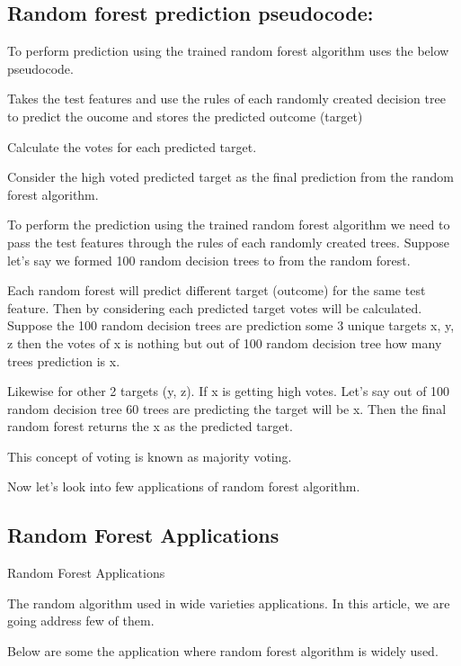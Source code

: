 


\subsection*{Random forest prediction pseudocode:}
To perform prediction using the trained random forest algorithm uses the below pseudocode.

Takes the test features and use the rules of each randomly created decision tree to predict the oucome and stores the predicted outcome (target)

Calculate the votes for each predicted target.

Consider the high voted predicted target as the final prediction from the random forest algorithm.

To perform the prediction using the trained random forest algorithm we need to pass the test features through the rules of each randomly created trees. Suppose let’s say we formed 100 random decision trees to from the random forest.

Each random forest will predict different target (outcome) for the same test feature. Then by considering each predicted target votes will be calculated. Suppose the 100 random decision trees are prediction some 3 unique targets x, y, z then the votes of x is nothing but out of 100 random decision tree how many trees prediction is x.

Likewise for other 2 targets (y, z). If x is getting high votes. Let’s say out of 100 random decision tree 60 trees are predicting the target will be x. Then the final random forest returns the x as the predicted target.

This concept of voting is known as majority voting.

Now let’s look into few applications of random forest algorithm.


\subsection*{Random Forest Applications}
Random Forest Applications

The random algorithm used in wide varieties applications. In this article, we are going address few of them.

Below are some the application where random forest algorithm is widely used.


